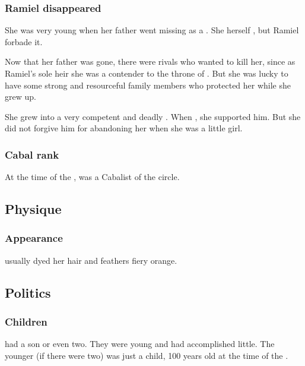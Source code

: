 \subsubsection{Ramiel disappeared}
She was very young when her father went missing as a \malach. 
She herself , but Ramiel forbade it. 

Now that her father was gone, there were rivals who wanted to kill her, since as Ramiel's sole heir she was a contender to the throne of \Mystraacht. 
But she was lucky to have some strong and resourceful family members who protected her while she grew up. 

She grew into a very competent and deadly \resvil. 
When , she supported him. 
But she did not forgive him for abandoning her when she was a little girl. 





\subsubsection{Cabal rank}
At the time of the \thirdbanewar, \Cishiel was a Cabalist of the \cishielcircle circle. 









\subsection{Physique}




\subsubsection{Appearance}
\Cishiel usually dyed her hair and feathers fiery orange. 









\subsection{Politics}





\subsubsection{Children}
\Cishiel had a son or even two.
They were young and had accomplished little.
The younger (if there were two) was just a child, 100 years old at the time of the \firstbanewar.





